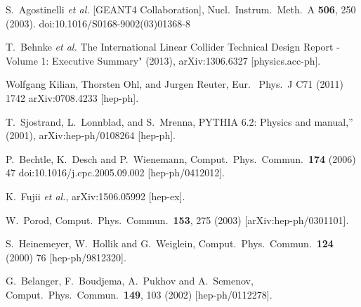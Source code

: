 \documentclass{PoS}
\begin{document}
\begin{thebibliography}{99}
  S.~Agostinelli {\it et al.} [GEANT4 Collaboration],
  Nucl.\ Instrum.\ Meth.\ A {\bf 506}, 250 (2003).
  doi:10.1016/S0168-9002(03)01368-8
  
   T.~Behnke {\it et al.}    
The International Linear Collider Technical Design Report - Volume 1: Executive Summary" (2013),
arXiv:1306.6327 [physics.acc-ph].
  

  
    Wolfgang Kilian, Thorsten Ohl, and Jurgen Reuter,
Eur. \ Phys.\  J {C71} (2011) 1742
arXiv:0708.4233 [hep-ph].

 T.~Sjostrand, L.~Lonnblad, and S.~Mrenna, 
PYTHIA 6.2: Physics and manual,” (2001), arXiv:hep-ph/0108264 [hep-ph].

  P.~Bechtle, K.~Desch and P.~Wienemann,
  Comput.\ Phys.\ Commun.\  {\bf 174} (2006) 47
  doi:10.1016/j.cpc.2005.09.002
  [hep-ph/0412012].
  
  K.~Fujii {\it et al.},
  arXiv:1506.05992 [hep-ex].
  
  W.~Porod,
  Comput.\ Phys.\ Commun.\  {\bf 153}, 275 (2003)
  [arXiv:hep-ph/0301101].
  
  S.~Heinemeyer, W.~Hollik and G.~Weiglein,
  Comput.\ Phys.\ Commun.\  {\bf 124} (2000) 76
  [hep-ph/9812320].


  
G.~Belanger, F.~Boudjema, A.~Pukhov and A.~Semenov,
  Comput.\ Phys.\ Commun.\  {\bf 149}, 103 (2002)
  [hep-ph/0112278].
  

\end{thebibliography}
\end{document}
